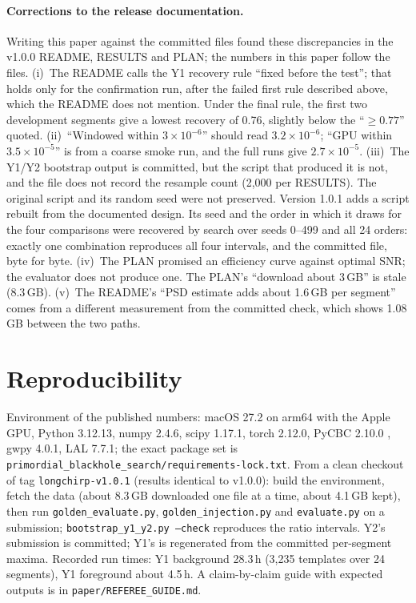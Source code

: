 \documentclass[11pt]{article}
\begin{document}
\paragraph{Corrections to the release documentation.} Writing this paper against the committed files found these
discrepancies in the v1.0.0 README, RESULTS and PLAN; the numbers in this paper follow the files.
(i)~The README calls the Y1 recovery rule ``fixed before the test''; that holds only for the confirmation run, after the
failed first rule described above, which the README does not mention. Under the final rule, the first two development
segments give a lowest recovery of 0.76, slightly below the ``$\geq 0.77$'' quoted.
(ii)~``Windowed within $3\times10^{-6}$'' should read $3.2\times10^{-6}$; ``GPU within $3.5\times10^{-5}$'' is from a
coarse smoke run, and the full runs give $2.7\times10^{-5}$.
(iii)~The Y1/Y2 bootstrap output is committed, but the script that produced it is not, and the file does not record
the resample count (2,000 per RESULTS). The original script and its random seed were not preserved. Version 1.0.1 adds a
script rebuilt from the documented design. Its seed and the order in which it draws for the four comparisons were
recovered by search over seeds 0--499 and all 24 orders: exactly one combination reproduces all four intervals, and
the committed file, byte for byte.
(iv)~The PLAN promised an efficiency curve against optimal SNR; the evaluator does not produce one. The PLAN's
``download about 3\,GB'' is stale (8.3\,GB).
(v)~The README's ``PSD estimate adds about 1.6\,GB per segment'' comes from a different measurement from the committed
check, which shows 1.08\,GB between the two paths.

\section{Reproducibility}
Environment of the published numbers: macOS 27.2 on arm64 with the Apple GPU, Python 3.12.13, numpy 2.4.6, scipy
1.17.1, torch 2.12.0, PyCBC 2.10.0 \cite{pycbc_soft}, gwpy 4.0.1, LAL 7.7.1; the exact package set is
\texttt{primordial\_blackhole\_search/requirements-lock.txt}. From a clean checkout of tag \texttt{longchirp-v1.0.1}
\cite{deepstrain101} (results identical to v1.0.0): build the environment, fetch the data (about 8.3\,GB downloaded one
file at a time, about 4.1\,GB kept), then run \texttt{golden\_evaluate.py}, \texttt{golden\_injection.py} and
\texttt{evaluate.py} on a submission; \texttt{bootstrap\_y1\_y2.py --check} reproduces the ratio intervals. Y2's submission is
committed; Y1's is regenerated from the committed per-segment maxima. Recorded run times: Y1 background 28.3\,h
(3,235 templates over 24 segments), Y1 foreground about 4.5\,h. A claim-by-claim guide with expected outputs is in
\texttt{paper/REFEREE\_GUIDE.md}.
\end{document}

